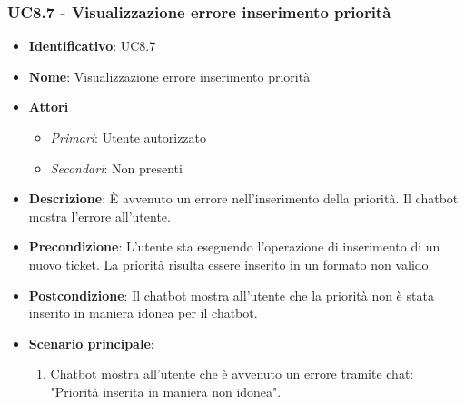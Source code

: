 \subsubsection{UC8.7 - Visualizzazione errore inserimento priorità}
\begin{itemize}
	\item \textbf{Identificativo}: UC8.7
	\item \textbf{Nome}:  Visualizzazione errore inserimento priorità
	\item \textbf{Attori}
	\begin{itemize} 
		\item \textit{Primari}: Utente autorizzato
		\item \textit{Secondari}: Non presenti
	\end{itemize}
	\item \textbf{Descrizione}: È avvenuto un errore nell'inserimento della priorità. Il chatbot mostra l'errore all'utente.
	\item \textbf{Precondizione}: L'utente sta eseguendo l'operazione di inserimento di un nuovo ticket. La priorità risulta essere inserito in un formato non valido. 
	\item \textbf{Postcondizione}: Il chatbot mostra all'utente che la priorità non è stata inserito in maniera idonea per il chatbot.
	\item \textbf{Scenario principale}: \begin{enumerate}
		\item Chatbot mostra all'utente che è avvenuto un errore tramite chat: "Priorità inserita in maniera non idonea".
	\end{enumerate}
\end{itemize}